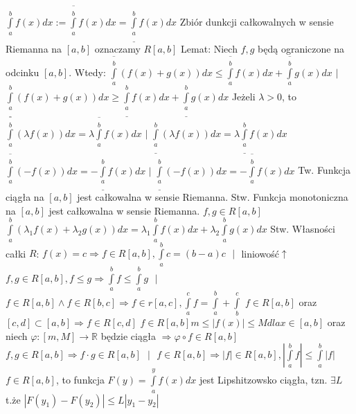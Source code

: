 \documentclass{article}
\begin{document}
$\int\limits_{a}^{b}f(x)dx:=\overline{\int\limits_{a}^{b}}f(x)dx=\underline{\int\limits_{a}^{b}}f(x)dx$\newline
Zbiór dunkcji całkowalnych w sensie Riemanna na $[a,b]$ oznaczamy $R[a,b]$\newline
Lemat: Niech $f,g$ będą ograniczone na odcinku $[a,b]$. Wtedy:\newline
$\overline{\int\limits_{a}^{b}}(f(x)+g(x))dx\le\overline{\int\limits_{a}^{b}}f(x)dx+\overline{\int\limits_{a}^{b}}g(x)dx$ $|$
$\underline{\int\limits_{a}^{b}}(f(x)+g(x))dx\ge\underline{\int\limits_{a}^{b}}f(x)dx+\underline{\int\limits_{a}^{b}}g(x)dx$\newline
Jeżeli $\lambda>0$, to $\overline{\int\limits_{a}^{b}}(\lambda f(x))dx=\lambda\overline{\int\limits_{a}^{b}}f(x)dx$ $|$ 
$\underline{\int\limits_{a}^{b}}(\lambda f(x))dx=\lambda\underline{\int\limits_{a}^{b}}f(x)dx$\newline
$\overline{\int\limits_{a}^{b}}(-f(x))dx=-\underline{\int\limits_{a}^{b}}f(x)dx$ $|$
$\underline{\int\limits_{a}^{b}}(-f(x))dx=-\overline{\int\limits_{a}^{b}}f(x)dx$\newline
Tw. Funkcja ciągła na $[a,b]$ jest całkowalna w sensie Riemanna.\newline
Stw. Funkcja monotoniczna na $[a,b]$ jest całkowalna w sensie Riemanna.\newline
$f,g\in R[a,b]$ $\int\limits_{a}^{b}(\lambda_1f(x)+\lambda_2g(x))dx=\lambda_1\int\limits_{a}^{b}f(x)dx+\lambda_2\int\limits_{a}^{b}g(x)dx$\newline
Stw. Własności całki $R$:\newline
$f(x)=c\Rightarrow f\in R[a,b],\int\limits_{a}^{b}c=(b-a)c$ $ $ $|$ $ $ liniowość$\uparrow$\newline
$f,g\in R[a,b], f\le g\Rightarrow\int\limits_{a}^{b}f\le\int\limits_{a}^{b}g$ $ $ $|$ $ $
$f\in R[a,b]\wedge f\in R[b,c]\Rightarrow f\in r[a,c],\int\limits_{a}^{c}f=\int\limits_{a}^{b}+\int\limits_{b}^{c}$\newline
$f\in R[a,b]$ oraz $[c,d]\subset[a,b]\Rightarrow f\in R[c,d]$\newline
$f\in R[a,b] m\le |f(x)|\le M dla x\in[a,b]$ oraz niech $\varphi:[m,M]\rightarrow\mathbb{R}$ będzie ciągła $\Rightarrow\varphi\circ f\in R[a,b]$\newline
$f,g\in R[a,b]\Rightarrow f\cdot g\in R[a,b]$ $ $ $|$ $ $
$f\in R[a,b]\Rightarrow |f|\in R[a,b],\left|\int\limits_{a}^{b}f\right|\le\int\limits_{a}^{b}|f|$\newline
$f\in R[a,b]$, to funkcja $F(y)=\int\limits_{a}^{y}f(x)dx$ jest Lipshitzowsko ciągła, tzn. $\exists L$ t.że $|F(y_1)-F(y_2)|\le L|y_1-y_2|$\newline
\end{document}
